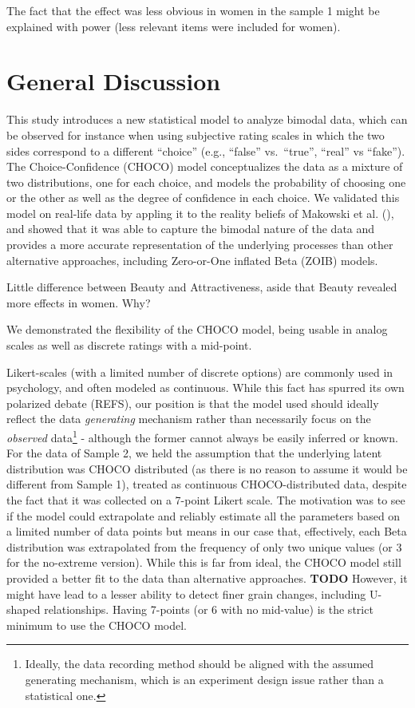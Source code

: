 \documentclass[
  jou,
  floatsintext,
  longtable,
  nolmodern,
  notxfonts,
  notimes,
  colorlinks=true,linkcolor=blue,citecolor=blue,urlcolor=blue]{apa7}
\begin{document}
The fact that the effect was less obvious in women in the sample 1 might
be explained with power (less relevant items were included for women).

\section{General Discussion}\label{general-discussion}

This study introduces a new statistical model to analyze bimodal data,
which can be observed for instance when using subjective rating scales
in which the two sides correspond to a different ``choice'' (e.g.,
``false'' vs.~``true'', ``real'' vs ``fake''). The Choice-Confidence
(CHOCO) model conceptualizes the data as a mixture of two distributions,
one for each choice, and models the probability of choosing one or the
other as well as the degree of confidence in each choice. We validated
this model on real-life data by appling it to the reality beliefs of
Makowski et al. (), and showed that
it was able to capture the bimodal nature of the data and provides a
more accurate representation of the underlying processes than other
alternative approaches, including Zero-or-One inflated Beta (ZOIB)
models.

Little difference between Beauty and Attractiveness, aside that Beauty
revealed more effects in women. Why?

We demonstrated the flexibility of the CHOCO model, being usable in
analog scales as well as discrete ratings with a mid-point.

Likert-scales (with a limited number of discrete options) are commonly
used in psychology, and often modeled as continuous. While this fact has
spurred its own polarized debate (REFS), our position is that the model
used should ideally reflect the data \emph{generating} mechanism rather
than necessarily focus on the \emph{observed} data\footnote{Ideally, the
  data recording method should be aligned with the assumed generating
  mechanism, which is an experiment design issue rather than a
  statistical one.} - although the former cannot always be easily
inferred or known. For the data of Sample 2, we held the assumption that
the underlying latent distribution was CHOCO distributed (as there is no
reason to assume it would be different from Sample 1), treated as
continuous CHOCO-distributed data, despite the fact that it was
collected on a 7-point Likert scale. The motivation was to see if the
model could extrapolate and reliably estimate all the parameters based
on a limited number of data points but means in our case that,
effectively, each Beta distribution was extrapolated from the frequency
of only two unique values (or 3 for the no-extreme version). While this
is far from ideal, the CHOCO model still provided a better fit to the
data than alternative approaches. \textbf{TODO} However, it might have
lead to a lesser ability to detect finer grain changes, including
U-shaped relationships. Having 7-points (or 6 with no mid-value) is the
strict minimum to use the CHOCO model.
\end{document}
